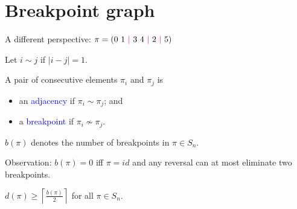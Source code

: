 \documentclass{beamer}
\theoremstyle{definition}
\newtheorem{algorithm}[theorem]{Algorithm}
\def\padding{\vspace{0.5cm}}
\def\spadding{\vspace{0.25cm}}
\def\b{\textcolor{blue}}
\def\r{\textcolor{red}}
\begin{document}




\section{Breakpoint graph}

\begin{frame}

A different perspective: $\pi = (0\ 1\ \r\mid\ 3\ 4\ \r\mid\ 2\ \r\mid\ 5)$\pause\spadding

\begin{definition}
Let $i \sim j$ if $|i - j| = 1$. \par\pause
A pair of consecutive elements $\pi_i$ and $\pi_j$ is
\begin{itemize}
    \item an \b{adjacency} if $\pi_i \sim \pi_j$; and
    \item a \b{breakpoint} if $\pi_i \not\sim \pi_j$.
\end{itemize} \par\pause\spadding
$b(\pi)$ denotes the number of breakpoints in $\pi \in S_n$.
\end{definition}\pause\padding

Observation: $b(\pi) = 0$ iff $\pi = id$ \pause and any reversal can at most eliminate two breakpoints. \pause\spadding

\begin{corollary}
$d(\pi) \geq \left\lceil \frac{b(\pi)}{2} \right\rceil$ for all $\pi \in S_n$.
\end{corollary}

\end{frame}
\end{document}
